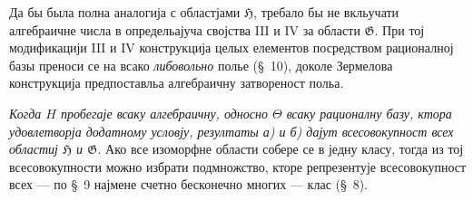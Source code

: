 ﻿\documentclass[11pt]{article}
\begin{document}
Да бы была полна аналогија с областјами $\mathfrak H$, требало бы не вкльучати алгебраичне числа в определьајуча својства III и IV за области $\mathfrak G$. При тој модификацији III и IV конструкција целых елементов посредством рационалној базы преноси се на всако {\itshape либовольно} полье (\S\ 10), доколе Зермелова конструкција предпоставльа алгебраичну затвореност польа.

{\itshape Когда $H$ пробегаје всаку алгебраичну, односно $\Theta$ всаку рационалну базу, ктора удовлетворја додатному условју, резултаты а) и б) дајут всесовокупност всех областиј $\mathfrak H$ и $\mathfrak G$.} Ако все изоморфне области собере се в једну класу, тогда из тој всесовокупности можно избрати подмножство, кторе репрезентује всесовокупност всех --- по \S\ 9 најмене счетно бесконечно многих --- клас (\S\ 8).
\end{document}
